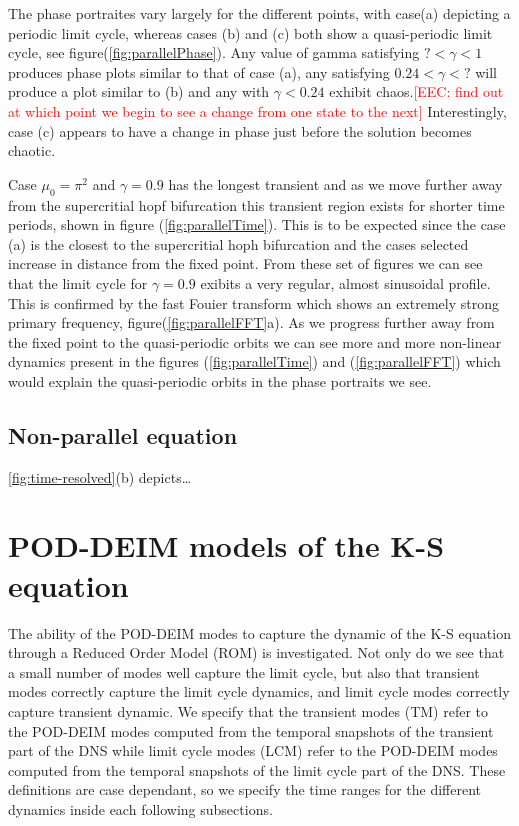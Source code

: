 \documentclass[11pt]{article}
\newcommand{\eec}[1]{\textcolor{red}{[EEC: #1]}}
\begin{document}
The phase portraites vary largely for the different points, with case(a) depicting a periodic limit cycle, whereas cases (b) and (c) both show a quasi-periodic limit cycle, see figure(\ref{fig:parallelPhase}). Any value of gamma satisfying $?<\gamma<1$ produces phase plots similar to that of case (a), any satisfying $0.24<\gamma<?$ will produce a plot similar to (b) and any with $\gamma<0.24$ exhibit chaos.\eec{find out at which point we begin to see a change from one state to the next} Interestingly, case (c) appears to have a change in phase just before the solution becomes chaotic. 

Case $\mu_0 = \pi^2$ and $\gamma = 0.9$ has the longest transient and as we move further away from the supercritial hopf bifurcation this transient region exists for shorter time periods, shown in figure (\ref{fig:parallelTime}).  This is to be expected since the case (a) is the closest to the supercritial hoph bifurcation and the cases selected increase in distance from the fixed point. From these set of figures we can see that the limit cycle for $\gamma = 0.9$ exibits a very regular, almost sinusoidal profile. This is confirmed by the fast Fouier transform which shows an extremely strong primary frequency, figure(\ref{fig:parallelFFT}a). As we progress further away from the fixed point to the quasi-periodic orbits we can see more and more non-linear dynamics present in the figures (\ref{fig:parallelTime}) and (\ref{fig:parallelFFT}) which would explain the quasi-periodic orbits in the phase portraits we see. 




\subsection{Non-parallel equation}

\autoref{fig:time-resolved}(b) depicts\ldots

\section{POD-DEIM models of the K-S equation}
\label{sec:pod-deim}
The ability of the POD-DEIM modes to capture the dynamic of the K-S equation through a Reduced Order Model (ROM) is investigated. Not only do we see that a small number of modes well capture the limit cycle, but also that transient modes correctly capture the limit cycle dynamics, and limit cycle modes correctly capture transient dynamic. We specify that the transient modes (TM) refer to the POD-DEIM modes computed from the temporal snapshots of the transient part of the DNS while limit cycle modes (LCM) refer to the POD-DEIM modes computed from the temporal snapshots of the limit cycle part of the DNS. These definitions are case dependant, so we specify the time ranges for the different dynamics inside each following subsections. 
\end{document}
